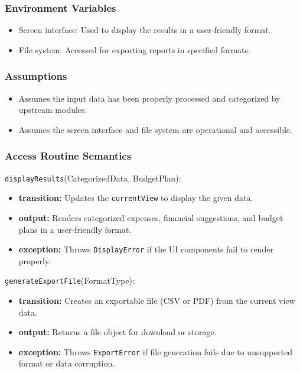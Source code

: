\documentclass[12pt, titlepage]{article}
\begin{document}
\subsubsection{Environment Variables}

\begin{itemize}
    \item Screen interface: Used to display the results in a user-friendly format.
    \item File system: Accessed for exporting reports in specified formats.
\end{itemize}

\subsubsection{Assumptions}

\begin{itemize}
    \item Assumes the input data has been properly processed and categorized by upstream modules.
    \item Assumes the screen interface and file system are operational and accessible.
\end{itemize}

\subsubsection{Access Routine Semantics}

\noindent \texttt{displayResults}(CategorizedData, BudgetPlan):
\begin{itemize}
    \item \textbf{transition:} Updates the \texttt{currentView} to display the given data.
    \item \textbf{output:} Renders categorized expenses, financial suggestions, and budget plans in a user-friendly format.
    \item \textbf{exception:} Throws \texttt{DisplayError} if the UI components fail to render properly.
\end{itemize}

\noindent \texttt{generateExportFile}(FormatType):
\begin{itemize}
    \item \textbf{transition:} Creates an exportable file (CSV or PDF) from the current view data.
    \item \textbf{output:} Returns a file object for download or storage.
    \item \textbf{exception:} Throws \texttt{ExportError} if file generation fails due to unsupported format or data corruption.
\end{itemize}
\end{document}
